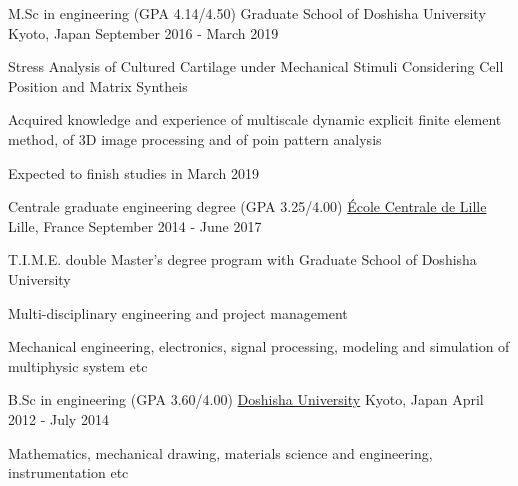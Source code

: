 \documentclass[12pt, a4paper]{cvncl}
\newcommand{\link}[2]{\href{#1}{#2}}
\begin{document}
\begin{cventries}
	\cventry
		{M.Sc in engineering (\scriptsize GPA 4.14/4.50)}
		{Graduate School of Doshisha University}
		{Kyoto, Japan}
		{September 2016 - March 2019}
		{\begin{cvitems}
			\item{Stress Analysis of Cultured Cartilage under Mechanical Stimuli Considering Cell Position and Matrix Syntheis}
			\item{Acquired knowledge and experience of multiscale dynamic explicit finite element method, of 3D image processing and of poin pattern analysis}
			\item{Expected to finish studies in March 2019}
		\end{cvitems}}
	\cventry
		{Centrale graduate engineering degree (\scriptsize GPA 3.25/4.00)}
		{\link{http://www.ec-lille.fr/en/index.html}{\'Ecole Centrale de Lille}}
		{Lille, France}
		{September 2014 - June 2017}
		{\begin{cvitems}
			\item{T.I.M.E. double Master's degree program with Graduate School of Doshisha University}
			\item{Multi-disciplinary engineering and project management}
			\item{Mechanical engineering, electronics, signal processing, modeling and simulation of multiphysic system etc}
		\end{cvitems}}
	\cventry
		{B.Sc in engineering (\scriptsize GPA 3.60/4.00)}
		{\link{http://biomedical.doshisha.ac.jp/en/overview/concept.html}{Doshisha University}}
		{Kyoto, Japan}
		{April 2012 - July 2014}
		{\begin{cvitems}
			\item{Mathematics, mechanical drawing, materials science and engineering, instrumentation etc}
		\end{cvitems}}
\end{cventries}


\begin{cvskills}
\end{cvskills}
\end{document}
